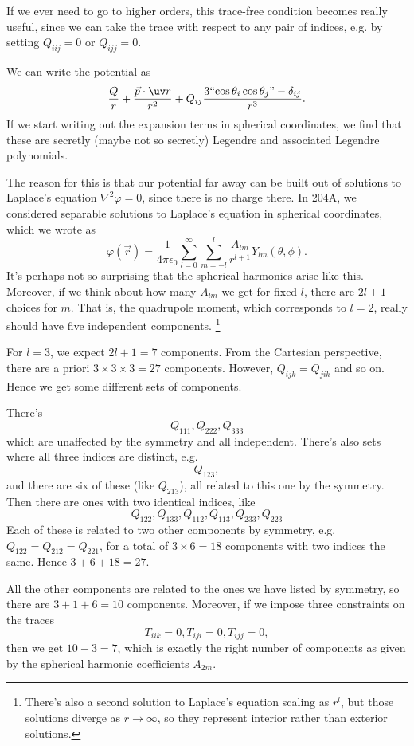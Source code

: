 If we ever need to go to higher orders, this trace-free condition becomes really useful, since we can take the trace with respect to any pair of indices, e.g. by setting $Q_{iij}=0$ or $Q_{ijj}=0$.

We can write the potential as
\begin{equation}
    \frac{Q}{r} + \frac{\vec p \cdot \uv r}{r^2} + Q_{ij} \frac{3 \text{``$\cos\theta_i \cos\theta_j$''} - \delta_{ij}}{r^3}.
\end{equation}
If we start writing out the expansion terms in spherical coordinates, we find that these are secretly (maybe not so secretly) Legendre and associated Legendre polynomials.

The reason for this is that our potential far away can be built out of solutions to Laplace's equation $\nabla^2 \varphi =0$, since there is no charge there. In 204A, we considered separable solutions to Laplace's equation in spherical coordinates, which we wrote as
\begin{equation}
    \varphi(\vec r) = \frac{1}{4\pi \epsilon_0} \sum_{l=0}^\infty \sum_{m=-l}^l \frac{A_{lm}}{r^{l+1}} Y_{lm}(\theta,\phi).
\end{equation}
It's perhaps not so surprising that the spherical harmonics arise like this. Moreover, if we think about how many $A_{lm}$ we get for fixed $l$, there are $2l+1$ choices for $m$. That is, the quadrupole moment, which corresponds to $l=2$, really should have five independent components.%
    \footnote{There's also a second solution to Laplace's equation scaling as $r^l$, but those solutions diverge as $r\to \infty$, so they represent interior rather than exterior solutions.}

For $l=3$, we expect $2l+1=7$ components. From the Cartesian perspective, there are a priori $3\times 3 \times 3=27$ components. However, $Q_{ijk} = Q_{jik}$ and so on. Hence we get some different sets of components. 

There's 
\begin{equation}
    Q_{111},Q_{222},Q_{333}
\end{equation}
which are unaffected by the symmetry and all independent. There's also sets where all three indices are distinct, e.g. 
\begin{equation}
    Q_{123},
\end{equation}
and there are six of these (like $Q_{213}$), all related to this one by the symmetry. Then there are ones with two identical indices, like 
\begin{equation}
    Q_{122},Q_{133},Q_{112},Q_{113},Q_{233},Q_{223}
\end{equation}
Each of these is related to two other components by symmetry, e.g. $Q_{122}= Q_{212} = Q_{221}$, for a total of $3\times 6 =18$ components with two indices the same. Hence $3+6+18=27$.

All the other components are related to the ones we have listed by symmetry, so there are $3+1+6=10$ components. Moreover, if we impose three constraints on the traces
\begin{equation}
    T_{iik}=0, T_{iji}=0, T_{ijj}=0,
\end{equation}
then we get $10-3=7$, which is exactly the right number of components as given by the spherical harmonic coefficients $A_{2m}$.